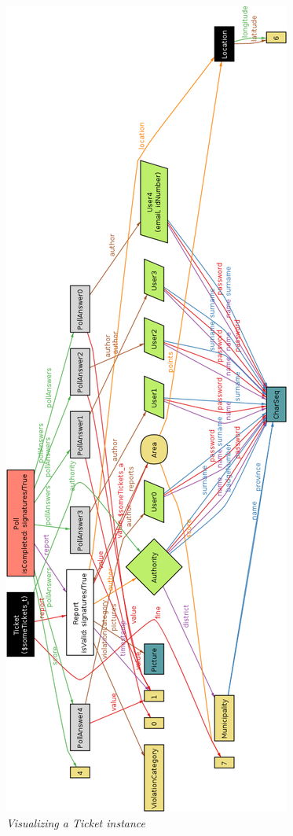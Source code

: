 \begin{figure}
  \centering
  \includegraphics[origin=c,width=\textwidth,height=.95\textheight,keepaspectratio]{RASD_Images/AlloyWorlds/someTickets.jpg}
  \caption{\textit{Visualizing a Ticket instance}}
\end{figure}
\newpage

